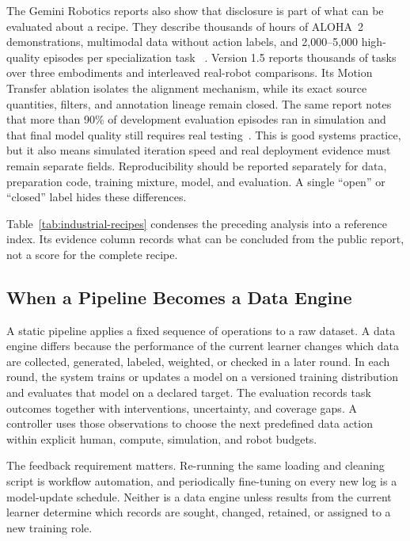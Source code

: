 The Gemini Robotics reports also show that disclosure is part of what can be evaluated about a recipe.
They describe thousands of hours of ALOHA~2 demonstrations, multimodal data without action labels, and 2,000--5,000 high-quality episodes per specialization task ~\cite{team2025gemini_2503_20020}.
Version 1.5 reports thousands of tasks over three embodiments and interleaved real-robot comparisons.
Its Motion Transfer ablation isolates the alignment mechanism, while its exact source quantities, filters, and annotation lineage remain closed.
The same report notes that more than 90\% of development evaluation episodes ran in simulation and that final model quality still requires real testing~\cite{team2025gemini_2510_03342}.
This is good systems practice, but it also means simulated iteration speed and real deployment evidence must remain separate fields.
Reproducibility should be reported separately for data, preparation code, training mixture, model, and evaluation.
A single ``open'' or ``closed'' label hides these differences.

Table~\ref{tab:industrial-recipes} condenses the preceding analysis into a reference index.
Its evidence column records what can be concluded from the public report, not a score for the complete recipe.



\subsection{When a Pipeline Becomes a Data Engine}

A static pipeline applies a fixed sequence of operations to a raw dataset.
A data engine differs because the performance of the current learner changes which data are collected, generated, labeled, weighted, or checked in a later round.
In each round, the system trains or updates a model on a versioned training distribution and evaluates that model on a declared target.
The evaluation records task outcomes together with interventions, uncertainty, and coverage gaps.
A controller uses those observations to choose the next predefined data action within explicit human, compute, simulation, and robot budgets.

The feedback requirement matters.
Re-running the same loading and cleaning script is workflow automation, and periodically fine-tuning on every new log is a model-update schedule.
Neither is a data engine unless results from the current learner determine which records are sought, changed, retained, or assigned to a new training role.

